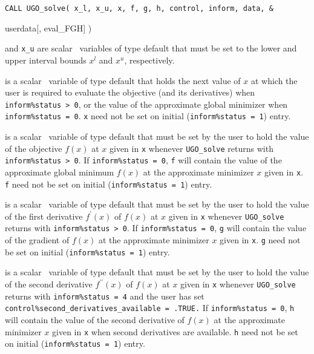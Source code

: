 \documentclass{galahad}
\newcommand{\packagename}{UGO}
\begin{document}
\hspace{8mm}
{\tt CALL \packagename\_solve( x\_l, x\_u, x, f, g, h, control, inform, data, \&
\vspace*{-1mm}

\hspace{37mm}
                        userdata[, eval\_FGH] )}
\vspace*{-2mm}
\begin{description}
 and {\tt x\_u} are scalar \intentin\ variables
of type default \realdp that must be set to the lower and upper
interval bounds $x^l$ and $x^u$, respectively.

 is a scalar \intentinout\ variable of type default \realdp that holds
the next value of $x$ at which the user is required to evaluate the
objective (and its derivatives) when {\tt inform\%status > 0},
or the value of the approximate global minimizer
when {\tt inform\%status = 0}.
{\tt x} need not be set on initial ({\tt inform\%status = 1}) entry.

 is a scalar \intentinout\ variable of type default \realdp that must
be set by the user to hold the value of the objective $f(x)$ at $x$ given
in {\tt x} whenever {\tt \packagename\_solve} returns with
{\tt inform\%status > 0}.
If {\tt inform\%status = 0}, {\tt f} will contain the value of the
approximate global minimum $f(x)$ at the approximate minimizer $x$
given in {\tt x}.
{\tt f} need not be set on initial ({\tt inform\%status = 1}) entry.

 is a scalar \intentinout\ variable of type default \realdp that must
be set by the user to hold the value of the first derivative $f^{\prime}(x)$
of $f(x)$ at $x$ given in {\tt x} whenever {\tt \packagename\_solve} returns
with {\tt inform\%status > 0}. If {\tt inform\%status = 0}, {\tt g}
will contain the value of the gradient of
$f(x)$ at the approximate minimizer $x$ given in {\tt x}.
{\tt g} need not be set on initial ({\tt inform\%status = 1}) entry.

 is a scalar \intentinout\ variable of type default \realdp that must
be set by the user to hold the value of the second derivative $f^{\prime\prime}(x)$
of $f(x)$ at $x$ given in {\tt x} whenever {\tt \packagename\_solve} returns
with {\tt inform\%status = 4}
and the user has set {\tt control\%second\_derivatives\_available = .TRUE.}
If {\tt inform\%status = 0}, {\tt h}
will contain the value of the second derivative of
$f(x)$ at the approximate minimizer $x$ given in {\tt x} when
second derivatives are available.
{\tt h} need not be set on initial ({\tt inform\%status = 1}) entry.


\end{description}
\end{document}
